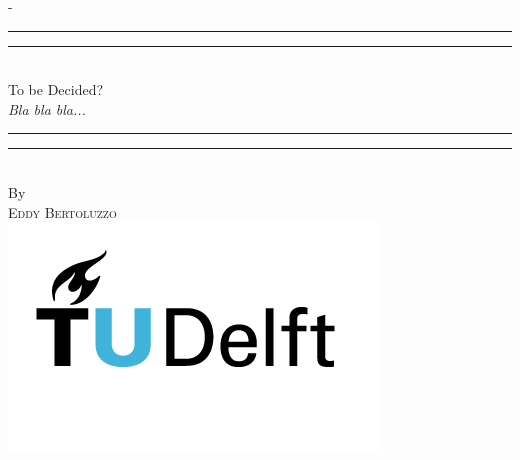 %
%
% 
%
%
\begin{titlingpage}
\begin{SingleSpace}
\calccentering{\unitlength} 
\begin{adjustwidth*}{\unitlength}{-\unitlength}
\vspace*{13mm}
\begin{center}
\rule[0.5ex]{\linewidth}{2pt}\vspace*{-\baselineskip}\vspace*{3.2pt}
\rule[0.5ex]{\linewidth}{1pt}\\[\baselineskip]
{\HUGE To be Decided?}\\[4mm]
{\Large \textit{Bla bla bla...}}\\
\rule[0.5ex]{\linewidth}{1pt}\vspace*{-\baselineskip}\vspace{3.2pt}
\rule[0.5ex]{\linewidth}{2pt}\\
\vspace{6.5mm}
{\large By}\\
\vspace{6.5mm}
{\large\textsc{Eddy Bertoluzzo}}\\
\vspace{11mm}
\includegraphics[scale=0.6]{logos/TU_Delft_logo_RGB}\\

\end{center}
\end{adjustwidth*}
\end{SingleSpace}
\end{titlingpage}
